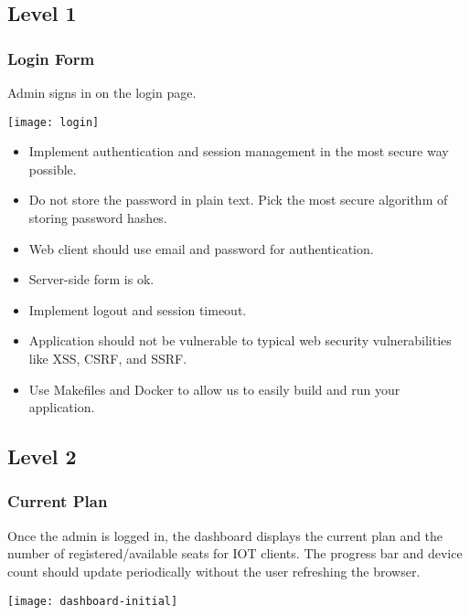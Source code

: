 \documentclass{article}
\begin{document}
  \subsection*{Level 1}

  \subsubsection*{Login Form}

  Admin signs in on the login page.

  \begin{center}
    \texttt{[image: login]}
  \end{center}

  \begin{itemize}
  \item Implement authentication and session management in the most secure way possible.
  \item Do not store the password in plain text. Pick the most secure algorithm of storing password hashes.
  \item Web client should use email and password for authentication.
  \item Server-side form is ok.
  \item Implement logout and session timeout.
  \item Application should not be vulnerable to typical web security vulnerabilities like XSS, CSRF, and SSRF.
  \item Use Makefiles and Docker to allow us to easily build and run your application.
  \end{itemize}

  \subsection*{Level 2}

  \subsubsection{Current Plan}

  Once the admin is logged in, the dashboard displays the current plan and the number of registered/available seats for IOT clients. The progress bar and device count should update periodically without the user refreshing the browser.

  \begin{center}
    \texttt{[image: dashboard-initial]}
  \end{center}
\end{document}
